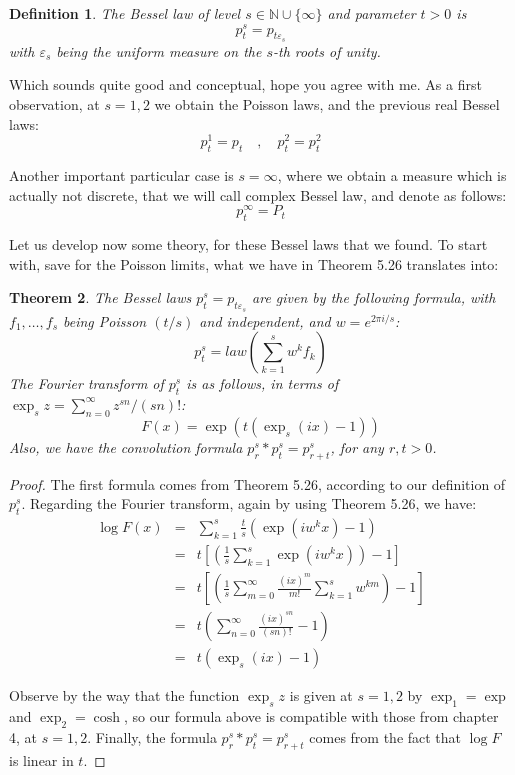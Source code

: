 \documentclass[12pt]{amsbook}
\newtheorem{theorem}{Theorem}[chapter]
\newtheorem{definition}[theorem]{Definition}
\begin{document}

\begin{definition}
The Bessel law of level $s\in\mathbb N\cup\{\infty\}$ and parameter $t>0$ is
$$p_t^s=p_{t\varepsilon_s}$$
with $\varepsilon_s$ being the uniform measure on the $s$-th roots of unity.
\end{definition}

Which sounds quite good and conceptual, hope you agree with me. As a first observation, at $s=1,2$ we obtain the Poisson laws, and the previous real Bessel laws:
$$p^1_t=p_t\quad,\quad 
p^2_t=p_t^2$$

Another important particular case is $s=\infty$, where we obtain a measure which is actually not discrete, that we will call complex Bessel law, and denote as follows:
$$p^\infty_t=P_t$$

Let us develop now some theory, for these Bessel laws that we found. To start with, save for the Poisson limits, what we have in Theorem 5.26 translates into:

\begin{theorem}
The Bessel laws $p_t^s=p_{t\varepsilon_s}$ are given by the following formula, with $f_1,\ldots,f_s$ being Poisson $(t/s)$ and independent, and $w=e^{2\pi i/s}$:
$$p^s_t=law\left(\sum_{k=1}^sw^kf_k\right)$$
The Fourier transform of $p^s_t$ is as follows, in terms of $\exp_sz=\sum_{n=0}^\infty z^{sn}/(sn)!$:
$$F(x)=\exp\left(t(\exp_s(ix)-1)\right)$$
Also, we have the convolution formula $p^s_r*p^s_t=p^s_{r+t}$, for any $r,t>0$.
\end{theorem}

\begin{proof}
The first formula comes from Theorem 5.26, according to our definition of $p^s_t$. Regarding the Fourier transform, again by using Theorem 5.26, we have:
\begin{eqnarray*}
\log F(x)
&=&\sum_{k=1}^s\frac{t}{s}\left(\exp(iw^kx)-1\right)\\
&=&t\left[\left(\frac{1}{s}\sum_{k=1}^s\exp(iw^kx)\right)-1\right]\\
&=&t\left[\left(\frac{1}{s}\sum_{m=0}^\infty\frac{(ix)^m}{m!}\sum_{k=1}^sw^{km}\right)-1\right]\\
&=&t\left(\sum_{n=0}^\infty\frac{(ix)^{sn}}{(sn)!}-1\right)\\
&=&t\left(\exp_s(ix)-1\right)
\end{eqnarray*}

Observe by the way that the function $\exp_sz$ is given at $s=1,2$ by $\exp_1=\exp$ and $\exp_2=\cosh$, so our formula above is compatible with those from chapter 4, at $s=1,2$. Finally, the formula $p^s_r*p^s_t=p^s_{r+t}$ comes from the fact that $\log F$ is linear in $t$.
\end{proof}
\end{document}
